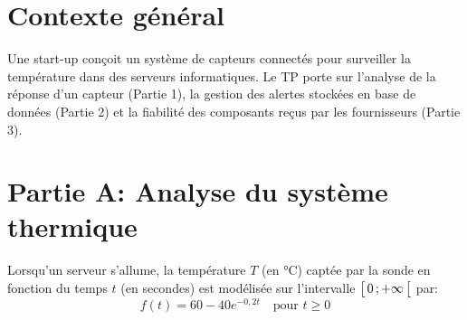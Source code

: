 \documentclass[11pt, a4paper]{report}
\begin{document}
\def\level{BTS}  %
\def\course{CIEL 1}
\def\chaptername{01} %
\def\docname{CCF Blanc}        %

\pagestyle{DS_FP}

\NomPrenomNote{}


\section*{Contexte général}

Une start-up conçoit un système de capteurs connectés pour surveiller la température dans des serveurs informatiques. Le TP porte sur l'analyse de la réponse d'un capteur (Partie 1), la gestion des alertes stockées en base de données (Partie 2) et la fiabilité des composants reçus par les fournisseurs (Partie 3).

\section*{Partie A\@: Analyse du système thermique}

Lorsqu'un serveur s'allume, la température $T$ (en °C) captée par la sonde en fonction du temps $t$ (en secondes) est modélisée sur l'intervalle $\bigl[ \, 0 \, ; +\infty \,\bigl[$ par:
\[f(t)=60  - 40e^{-0,2t} \quad \text{pour } t \geq 0\]
\end{document}
